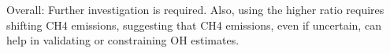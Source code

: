 Overall: Further investigation is required. Also, using the higher ratio requires shifting CH4 emissions, suggesting that CH4 emissions, even if uncertain, can help in validating or constraining OH estimates.



















































